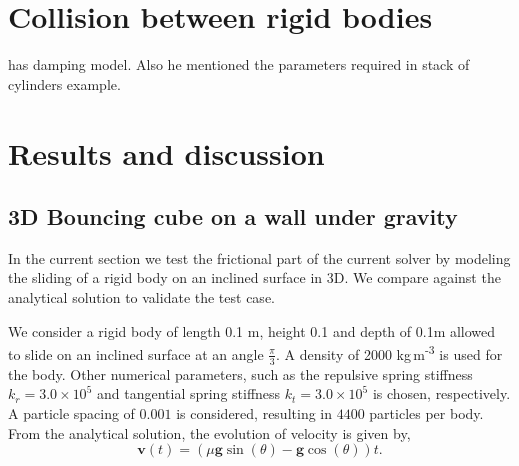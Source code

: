 \documentclass[preprint,12pt]{elsarticle}
\newcommand{\todoin}{\todo[inline]}
\newcommand{\teng}[1]{\ensuremath{\boldsymbol{#1}}}
\newcommand{\ten}[1]{\ensuremath{\mathbf{#1}}}
\begin{document}
\section{Collision between rigid bodies}
\label{sec:contact-force}

\citet{chen2019coupled} has damping model. Also he mentioned the parameters
required in stack of cylinders example.





\section{Results and discussion}
\label{sec:results}

\subsection{3D Bouncing cube on a wall under gravity}
\label{sec:bouncing-cube}

In the current section we test the frictional part of the current solver by
modeling the sliding of a rigid body on an inclined surface in 3D. We compare
against the analytical solution to validate the test case.

We consider a rigid body of length 0.1 m, height 0.1 and depth of 0.1m allowed
to slide on an inclined surface at an angle $\frac{\pi}{3}$. A density of 2000
kg\,m\textsuperscript{-3} is used for the body. Other numerical parameters,
such as the repulsive spring stiffness $k_r=3.0 \times 10^{5}$ and tangential
spring stiffness $k_t=3.0 \times 10^{5}$ is chosen, respectively. A particle
spacing of $0.001$ is considered, resulting in $4400$ particles per body. From
the analytical solution, the evolution of velocity is given by,
\begin{equation}
  \label{eq:ce}
  \ten{v}(t) = (\mu \teng{g} \sin (\theta) - \teng{g} \cos (\theta)) t.
\end{equation}
\end{document}
